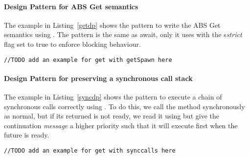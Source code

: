 \paragraph{Design Pattern for ABS Get semantics}
The example in Listing~\ref{getdp} shows the pattern to write the ABS Get semantics using \gspawn. The pattern is the same as await, only it uses \gspawn with the s\textit{strict} flag set to true to enforce blocking behaviour.
\begin{lstlisting}[caption= ABS Get Design Pattern, label=getdp]
//TODO add an example for get with getSpawn here
\end{lstlisting}

\paragraph{Design Pattern for preserving a synchronous call stack}
The example in Listing~\ref{syncdp} shows the pattern to execute a chain of synchronous calls correctly using \gspawn. To do this, we call the method synchronously as normal, but if its returned \future is not ready, we read it using \gspawn but give the continuation \textit{message} a higher priority such that it will execute first when the future is ready.
\begin{lstlisting}[caption= Synchronous Call Design Pattern, label=syncdp]
//TODO add an example for get with synccalls here
\end{lstlisting}


